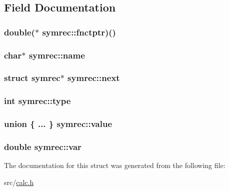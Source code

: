 \subsection{Field Documentation}
\hypertarget{structsymrec_a841939294a168dadc7dc230596f932ca}{
\subsubsection[{fnctptr}]{\setlength{\rightskip}{0pt plus 5cm}double($\ast$ symrec\+::fnctptr)()}}\label{structsymrec_a841939294a168dadc7dc230596f932ca}
\hypertarget{structsymrec_a13b3ddedd56ed8a393dfd4b266bb81e1}{
\subsubsection[{name}]{\setlength{\rightskip}{0pt plus 5cm}char$\ast$ symrec\+::name}}\label{structsymrec_a13b3ddedd56ed8a393dfd4b266bb81e1}
\hypertarget{structsymrec_a799aa9b5b3ee76aa0634b0ad96f80ea1}{
\subsubsection[{next}]{\setlength{\rightskip}{0pt plus 5cm}struct {\bf symrec}$\ast$ symrec\+::next}}\label{structsymrec_a799aa9b5b3ee76aa0634b0ad96f80ea1}
\hypertarget{structsymrec_a3ed0bae32ad0e16423a49153484094f8}{
\subsubsection[{type}]{\setlength{\rightskip}{0pt plus 5cm}int symrec\+::type}}\label{structsymrec_a3ed0bae32ad0e16423a49153484094f8}
\hypertarget{structsymrec_aabe0b508928c6472fcbdf5071c33b61a}{
\subsubsection[{value}]{\setlength{\rightskip}{0pt plus 5cm}union \{ ... \}   symrec\+::value}}\label{structsymrec_aabe0b508928c6472fcbdf5071c33b61a}
\hypertarget{structsymrec_af3db0c7e569f93a9d7385d5b170578f8}{
\subsubsection[{var}]{\setlength{\rightskip}{0pt plus 5cm}double symrec\+::var}}\label{structsymrec_af3db0c7e569f93a9d7385d5b170578f8}


The documentation for this struct was generated from the following file\+:\begin{DoxyCompactItemize}
\item 
src/\hyperlink{calc_8h}{calc.\+h}\end{DoxyCompactItemize}
